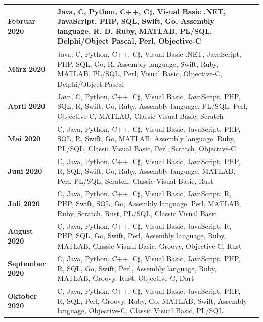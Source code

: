\documentclass[ngerman]{article}
\begin{document}
    \begin{tabularx}{\textwidth}{|l|X|c|}
        \hline
        \textbf{Februar 2020}&Java, C, Python, C++, C$\sharp$, Visual Basic .NET, JavaScript, PHP, SQL, Swift, Go, Assembly language, R, D, Ruby, MATLAB, PL/SQL, Delphi/Object Pascal, Perl, Objective-C&\cite{TIOBE Index 02.2020}\\
        \hline
        \textbf{März 2020}&Java, C, Python, C++, C$\sharp$, Visual Basic .NET, JavaScript, PHP, SQL, Go, R, Assembly language, Swift, Ruby, MATLAB, PL/SQL, Perl, Visual Basic, Objective-C, Delphi/Object Pascal&\cite{TIOBE Index 03.2020}\\
        \hline
        \textbf{April 2020}&Java, C, Python, C++, C$\sharp$, Visual Basic, JavaScript, PHP, SQL, R, Swift, Go, Ruby, Assembly language, PL/SQL, Perl, Objective-C, MATLAB, Classic Visual Basic, Scratch&\cite{TIOBE Index 04.2020}\\
        \hline
        \textbf{Mai 2020}&C, Java, Python, C++, C$\sharp$, Visual Basic, JavaScript, PHP, SQL, R, Swift, Go, MATLAB, Assembly language, Ruby, PL/SQL, Classic Visual Basic, Perl, Scratch, Objective-C&\cite{TIOBE Index 05.2020}\\
        \hline
        \textbf{Juni 2020}&C, Java, Python, C++, C$\sharp$, Visual Basic, JavaScript, PHP, R, SQL, Swift, Go, Ruby, Assembly language, MATLAB, Perl, PL/SQL, Scratch, Classic Visual Basic, Rust&\cite{TIOBE Index 06.2020}\\
        \hline
        \textbf{Juli 2020}&C, Java, Python, C++, C$\sharp$, Visual Basic, JavaScript, R, PHP, Swift, SQL, Go, Assembly language, Perl, MATLAB, Ruby, Scratch, Rust, PL/SQL, Classic Visual Basic&\cite{TIOBE Index 07.2020}\\
        \hline
        \textbf{August 2020}&C, Java, Python, C++, C$\sharp$, Visual Basic, JavaScript, R, PHP, SQL, Go, Swift, Perl, Assembly language, Ruby, MATLAB, Classic Visual Basic, Groovy, Objective-C, Rust&\cite{TIOBE Index 08.2020}\\
        \hline
        \textbf{September 2020}&C, Java, Python, C++, C$\sharp$, Visual Basic, JavaScript, PHP, R, SQL, Go, Swift, Perl, Assembly language, Ruby, MATLAB, Groovy, Rust, Objective-C, Dart&\cite{TIOBE Index 09.2020}\\
        \hline
        \textbf{Oktober 2020}&C, Java, Python, C++, C$\sharp$, Visual Basic, JavaScript, PHP, R, SQL, Perl, Groovy, Ruby, Go, MATLAB, Swift, Assembly language, Objective-C, Classic Visual Basic, PL/SQL&\cite{TIOBE Index 10.2020}\\
        \hline
    \end{tabularx}
\end{document}
